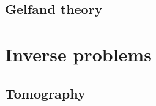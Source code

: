 \documentclass[doctor]{thesis}
\begin{document}
\section{Gelfand theory}
\label{sec:gelfand_theory}




\chapter{Inverse problems}

\section{Tomography}
\label{sec:tomography}


%




%
%
%
%

%




\end{document}
